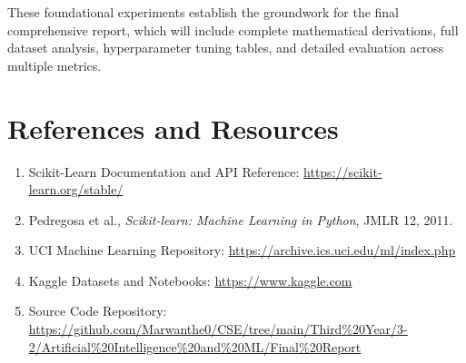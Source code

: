 \documentclass[12pt]{article}
\begin{document}
These foundational experiments establish the groundwork for the final comprehensive report, which will include complete mathematical derivations, full dataset analysis, hyperparameter tuning tables, and detailed evaluation across multiple metrics.

\section{References and Resources}

\begin{enumerate}[leftmargin=2em, itemsep=4pt]
    \item Scikit-Learn Documentation and API Reference: \url{https://scikit-learn.org/stable/}
    \item Pedregosa et al., \textit{Scikit-learn: Machine Learning in Python}, JMLR 12, 2011.
    \item UCI Machine Learning Repository: \url{https://archive.ics.uci.edu/ml/index.php}
    \item Kaggle Datasets and Notebooks: \url{https://www.kaggle.com}
    \item Source Code Repository: \url{https://github.com/Marwanthe0/CSE/tree/main/Third%20Year/3-2/Artificial%20Intelligence%20and%20ML/Final%20Report}
\end{enumerate}
\end{document}
